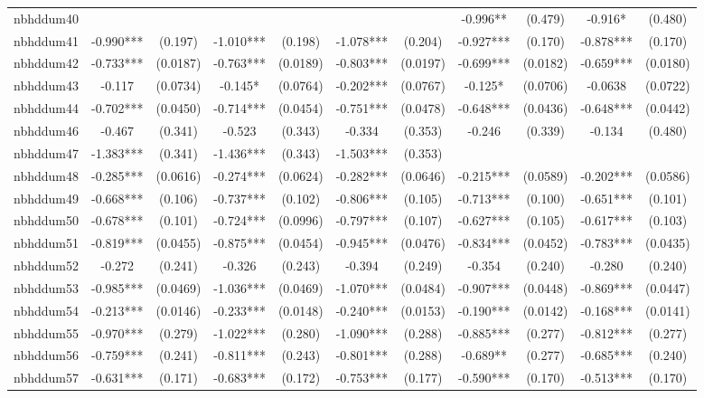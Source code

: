 \documentclass[]{article}
\begin{document}
\begin{tabular}{lcccccccccc}
nbhddum40 &  &  &  &  &  &  & -0.996** & (0.479) & -0.916* & (0.480) \\
nbhddum41 & -0.990*** & (0.197) & -1.010*** & (0.198) & -1.078*** & (0.204) & -0.927*** & (0.170) & -0.878*** & (0.170) \\
nbhddum42 & -0.733*** & (0.0187) & -0.763*** & (0.0189) & -0.803*** & (0.0197) & -0.699*** & (0.0182) & -0.659*** & (0.0180) \\
nbhddum43 & -0.117 & (0.0734) & -0.145* & (0.0764) & -0.202*** & (0.0767) & -0.125* & (0.0706) & -0.0638 & (0.0722) \\
nbhddum44 & -0.702*** & (0.0450) & -0.714*** & (0.0454) & -0.751*** & (0.0478) & -0.648*** & (0.0436) & -0.648*** & (0.0442) \\
nbhddum46 & -0.467 & (0.341) & -0.523 & (0.343) & -0.334 & (0.353) & -0.246 & (0.339) & -0.134 & (0.480) \\
nbhddum47 & -1.383*** & (0.341) & -1.436*** & (0.343) & -1.503*** & (0.353) &  &  &  &  \\
nbhddum48 & -0.285*** & (0.0616) & -0.274*** & (0.0624) & -0.282*** & (0.0646) & -0.215*** & (0.0589) & -0.202*** & (0.0586) \\
nbhddum49 & -0.668*** & (0.106) & -0.737*** & (0.102) & -0.806*** & (0.105) & -0.713*** & (0.100) & -0.651*** & (0.101) \\
nbhddum50 & -0.678*** & (0.101) & -0.724*** & (0.0996) & -0.797*** & (0.107) & -0.627*** & (0.105) & -0.617*** & (0.103) \\
nbhddum51 & -0.819*** & (0.0455) & -0.875*** & (0.0454) & -0.945*** & (0.0476) & -0.834*** & (0.0452) & -0.783*** & (0.0435) \\
nbhddum52 & -0.272 & (0.241) & -0.326 & (0.243) & -0.394 & (0.249) & -0.354 & (0.240) & -0.280 & (0.240) \\
nbhddum53 & -0.985*** & (0.0469) & -1.036*** & (0.0469) & -1.070*** & (0.0484) & -0.907*** & (0.0448) & -0.869*** & (0.0447) \\
nbhddum54 & -0.213*** & (0.0146) & -0.233*** & (0.0148) & -0.240*** & (0.0153) & -0.190*** & (0.0142) & -0.168*** & (0.0141) \\
nbhddum55 & -0.970*** & (0.279) & -1.022*** & (0.280) & -1.090*** & (0.288) & -0.885*** & (0.277) & -0.812*** & (0.277) \\
nbhddum56 & -0.759*** & (0.241) & -0.811*** & (0.243) & -0.801*** & (0.288) & -0.689** & (0.277) & -0.685*** & (0.240) \\
nbhddum57 & -0.631*** & (0.171) & -0.683*** & (0.172) & -0.753*** & (0.177) & -0.590*** & (0.170) & -0.513*** & (0.170) \\

\end{tabular}
\end{document}
